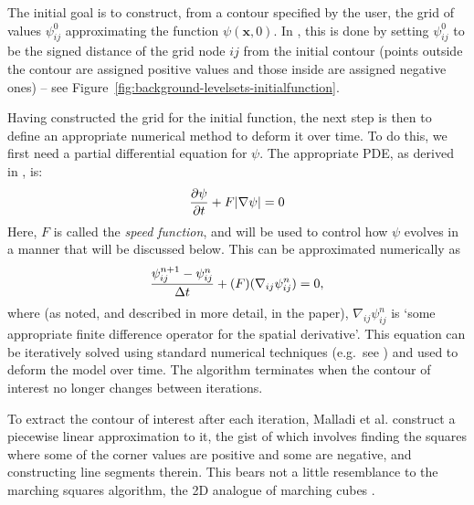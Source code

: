 
The initial goal is to construct, from a contour specified by the user, the grid of values $\psi_{ij}^0$ approximating the function $\psi(\mathbf{x},0)$. In \cite{malladi95}, this is done by setting $\psi_{ij}^0$ to be the signed distance of the grid node $ij$ from the initial contour (points outside the contour are assigned positive values and those inside are assigned negative ones) -- see Figure~\ref{fig:background-levelsets-initialfunction}.


Having constructed the grid for the initial function, the next step is then to define an appropriate numerical method to deform it over time. To do this, we first need a partial differential equation for $\psi$. The appropriate PDE, as derived in \cite{malladi95}, is:
%
\[
\frac{\partial \psi}{\partial t} + F|\nabla \psi| = 0
\]
%
Here, $F$ is called the \emph{speed function}, and will be used to control how $\psi$ evolves in a manner that will be discussed below. This can be approximated numerically as
%
\[
\frac{\psi_{ij}^{n+1} - \psi_{ij}^n}{\Delta t} + (F)(\nabla_{ij} \psi_{ij}^n) = 0,
\]
%
where (as noted, and described in more detail, in the paper), $\nabla_{ij} \psi_{ij}^n$ is `some appropriate finite difference operator for the spatial derivative'. This equation can be iteratively solved using standard numerical techniques (e.g.~see \cite{morton05}) and used to deform the model over time. The algorithm terminates when the contour of interest no longer changes between iterations.

To extract the contour of interest after each iteration, Malladi et al. construct a piecewise linear approximation to it, the gist of which involves finding the squares where some of the corner values are positive and some are negative, and constructing line segments therein. This bears not a little resemblance to the marching squares algorithm, the 2D analogue of marching cubes \cite{lorensen87}.

